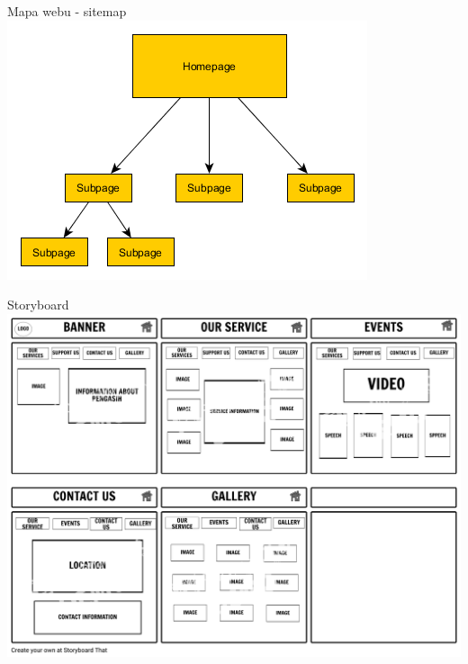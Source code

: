 \documentclass{beamer}
\begin{document}
\begin{frame}{Mapa webu - sitemap}
	  \includegraphics[width=\columnwidth]{sitemap}
\end{frame}


\begin{frame}{Storyboard}
	  \includegraphics[width=\columnwidth]{storyboard}
\end{frame}
\end{document}
